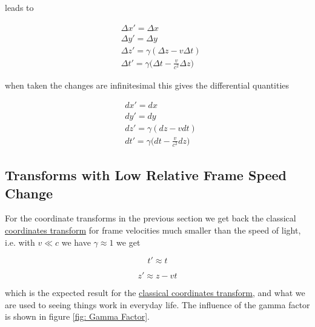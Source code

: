 leads to

\begin{equation}
	\label{eq: interval of Coordinates}
	\begin{aligned}
		 & \Delta x'= \Delta x                                              \\
		 & \Delta y'= \Delta y                                              \\
		 & \Delta z' = {\gamma} ( \Delta z-v \Delta t)                      \\
		 & \Delta t'={\gamma} \bigg( \Delta t-\frac{v}{c^2} \Delta z \bigg)
	\end{aligned}
\end{equation}

when taken the changes are infinitesimal this gives the differential quantities

\begin{equation}
	\label{eq: Infintesmal interval of Coordinates}
	\begin{aligned}
		 & dx'=dx                                        \\
		 & dy'=dy                                        \\
		 & dz' = {\gamma} (dz-vdt)                       \\
		 & dt'={\gamma} \bigg(dt-\frac{v}{c^2} dz \bigg)
	\end{aligned}
\end{equation}

\subsection{Transforms with Low Relative Frame Speed Change}

For the coordinate transforms in the previous section we get back the classical \hyperlink{def-galilean-transform}{coordinates transform} for frame velocities much smaller than the speed of light, i.e. with $v\ll c$ we have ${\gamma} \approx 1$ we get

\begin{equation}
	t' \approx t
\end{equation}

\begin{equation}
	z{'} \approx z - vt
\end{equation}

which is the expected result for the \hyperlink{def-galilean-transform}{classical coordinates transform}, and what we are used to seeing things work in everyday life. The influence of the gamma factor is shown in figure \ref{fig: Gamma Factor}.

